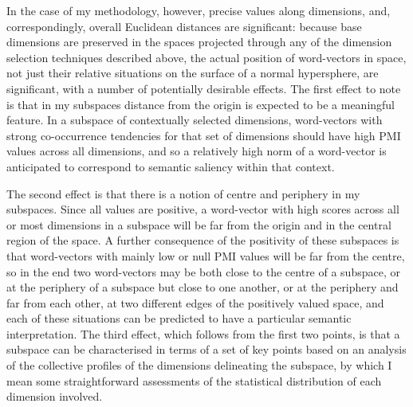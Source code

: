 In the case of my methodology, however, precise values along dimensions, and, correspondingly, overall Euclidean distances are significant: because base dimensions are preserved in the spaces projected through any of the dimension selection techniques described above, the actual position of word-vectors in space, not just their relative situations on the surface of a normal hypersphere, are significant, with a number of potentially desirable effects.  The first effect to note is that in my subspaces distance from the origin is expected to be a meaningful feature.  In a subspace of contextually selected dimensions, word-vectors with strong co-occurrence tendencies for that set of dimensions should have high PMI values across all dimensions, and so a relatively high norm of a word-vector is anticipated to correspond to semantic saliency within that context.

The second effect is that there is a notion of centre and periphery in my subspaces.  Since all values are positive, a word-vector with high scores across all or most dimensions in a subspace will be far from the origin and in the central region of the space.  A further consequence of the positivity of these subspaces is that word-vectors with mainly low or null PMI values will be far from the centre, so in the end two word-vectors may be both close to the centre of a subspace, or at the periphery of a subspace but close to one another, or at the periphery and far from each other, at two different edges of the positively valued space, and each of these situations can be predicted to have a particular semantic interpretation.  The third effect, which follows from the first two points, is that a subspace can be characterised in terms of a set of key points based on an analysis of the collective profiles of the dimensions delineating the subspace, by which I mean some straightforward assessments of the statistical distribution of each dimension involved.

